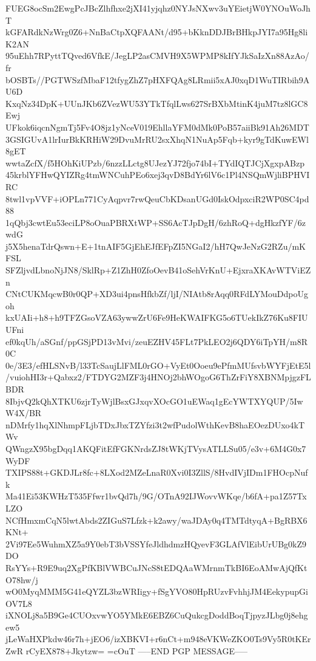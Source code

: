 FUEG8ocSm2EwgPcJBcZlhfhxe2jXI41yjqhz0NYJsNXwv3uYEietjW0YNOuWoJhT
kGFARdkNzWrg0Z6+NnBaCtpXQFAANt/d95+bKknDDJBrBHkpJYI7a95Hg8liK2AN
95uEhh7RPyttTQved6VfkE/JegLP2asCMVH9X5WPMP8kIfYJkSaIzXn88AzAo/fr
bOSBTs//PGTWSzfMbaF12tfygZhZ7pHXFQAg8LRmii5xAJ0xqD1WuTIRbih9AU6D
KxqNz34DpK+UUnJKb6ZVezWU53YTkTfqlLws627SrBXbMtinK4juM7tz8lGC8Ewj
UFkok6iqcnNgmTj5Fv4O8jz1yNceV019EhllaYFM0dMk0PoB57aiiBk91Ah26MDT
3GSIGUvA1lrIurBkKRHiW29DvuMrRU2sxXhqN1NuAp5Fqb+kyr9gTdKuwEWl8gET
wwtaZcfX/f5HOhKiUPzb/6nzzLLctg8UJezYJ72fjo74bI+TYdIQTJCjXgxpABzp
45krblYFHwQYIZRg4tmWNCuhPEo6xej3qvD8BdYr6lV6c1Pl4NSQmWjliBPHVIRC
8twl1vpVVF+iOPLn771CyAqpvr7rwQeuCbKDsanUGd0IskOdpxciR2WP0SC4pd88
1qQbj3cwtEu53eciLP8oOuaPBRXtWP+SS6AcTJpDgH/6zhRoQ+dgHkzfYF/6zwdG
j5X5henaTdrQswn+E+1tnAIF5GjEhEJfEFpZI5NGaI2/hH7QwJeNzG2RZu/mKFSL
SFZljvdLbnoNjJN8/SklRp+Z1ZhH0ZfoOevB41oSehVrKnU+EjxraXKAvWTViEZn
CNtCUKMqcwB0r0QP+XD3ui4pnsHfkbZf/ljI/NIAtb8rAqq0RFdLYMouDdpoUgoh
kxUAIi+h8+h9TFZGsoVZA63ywwZrU6Fe9HeKWAIFKG5o6TUekIkZ76Ku8FIUUFni
ef0kqUh/aSGnf/ppGSjPD13vMvi/zeuEZHV45FLt7PkLEO2j6QDY6iTpYH/m8R0C
0e/3E3/efHLSNvB/l33TcSaujLlFML0rGO+VyEt0Ooeu9ePfmMUfsvbWYFjEtE5l
/vuiohHI3r+Qabxz2/FTDYG2MZF3j4HNOj2bhWOgoG6ThZrFiY8XBNMpjgzFLBDR
8IbjvQ2kQhXTKU6zjrTyWjlBsxGJxqvXOcGO1uEWaq1gEcYWTXYQUP/5IwW4X/BR
nDMrfy1hqXlNhmpFLjbTDxJbxTZYfzi3t2wfPudolWthKevB8haEOezDUxo4kTWv
QWngzX95bgDqq1AKQFitEfFGKNrdsZJ8tWKjTVysATLLSu05/e3v+6M4G0x7WyDF
TXIPS88t+GKDJLr8fc+8LXod2MZeLnaR0Xvi0I3ZllS/8HvdIVjIDm1FHOcpNufk
Ma41Ei53KWHzT535Ffwr1bvQd7h/9G/OTnA92IJWovvWKqe/b6fA+pa1Z57TxLZO
NCfHmxmCqN5lwtAbds2ZIGuS7Lfzk+k2awy/waJDAy0q4TMTdtyqA+BgRBX6KNt+
2Vi97Ee5WuhmXZ5a9Y0ebT3bVSSYfeJldhdmzHQyevF3GLAfVlEibUrUBg0kZ9DO
RsYYs+R9E9uq2XgPfKBlVWBCuJNcS8tEDQAaWMrnmTkBI6EoAMwAjQfKtO78hw/j
wO0MyqMMM5G41eQYZL3bzWRIigy+fSgYVO80HpRUzvFvhhjJM4EekypupGiOV7L8
iXNOLj8a5B9Ge4CUOxvwYO5YMkE6EBZ6CuQukcgDoddBoqTjpyzJLbg0j8ehgew5
jLeWaHXPkdw46r7h+jEO6/izXBKVI+r6nCt+m948eVKWeZKO0Ts9Vy5R0tKErZwR
rCyEX878+Jkytzw=
=cOuT
-----END PGP MESSAGE-----
